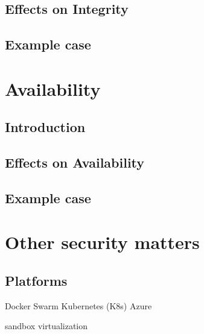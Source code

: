 \subsection{Effects on Integrity}
\subsection{Example case}

\section{Availability}

\subsection{Introduction}
\begin{sloppypar}

\end{sloppypar}

\subsection{Effects on Availability}
\begin{sloppypar}

\end{sloppypar}

\subsection{Example case}
\begin{sloppypar}

\end{sloppypar}




\section{Other security matters}
    \subsection{Platforms}
        \begin{sloppypar}

        \end{sloppypar}
    
    Docker Swarm
    Kubernetes (K8s)
    Azure

    sandbox
    virtualization 

